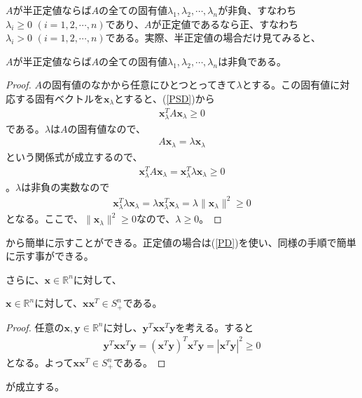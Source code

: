 $A$が半正定値ならば$A$の全ての固有値$\lambda_1, \lambda_2, \cdots, \lambda_n$が非負、すなわち$\lambda_i \geq 0 \,\, (i = 1, 2, \cdots, n)$であり、$A$が正定値であるなら正、すなわち$\lambda_i > 0 \,\, (i = 1, 2, \cdots, n)$である。実際、半正定値の場合だけ見てみると、
\begin{theorem*}
  $A$が半正定値ならば$A$の全ての固有値$\lambda_1, \lambda_2, \cdots, \lambda_n$は非負である。
\end{theorem*}
\begin{proof}
  $A$の固有値のなかから任意にひとつとってきて$\lambda$とする。この固有値に対応する固有ベクトルを$\mathbf{x}_\lambda$とすると、(\ref{PSD})から
  \begin{align*}
    \mathbf{x}_\lambda^T A \mathbf{x}_\lambda \geq 0
  \end{align*}
  である。$\lambda$は$A$の固有値なので、
  \begin{align*}
    A \mathbf{x}_\lambda = \lambda \mathbf{x}_\lambda
  \end{align*}
  という関係式が成立するので、
  \begin{align*}
    \mathbf{x}_\lambda^T A \mathbf{x}_\lambda = \mathbf{x}_\lambda^T \lambda \mathbf{x}_\lambda \geq 0
  \end{align*}
  。$\lambda$は非負の実数なので
  \begin{align*}
    \mathbf{x}_\lambda^T \lambda \mathbf{x}_\lambda = \lambda \mathbf{x}_\lambda^T \mathbf{x}_\lambda = \lambda \|\mathbf{x}_\lambda\|^2 \geq 0
  \end{align*}
  となる。ここで、$\|\mathbf{x}_\lambda\|^2 \geq 0$なので、$\lambda \geq 0$。
\end{proof}
から簡単に示すことができる。正定値の場合は(\ref{PD})を使い、同様の手順で簡単に示す事ができる。

さらに、$\mathbf{x} \in \mathbb{R}^n$に対して、
\begin{lemma*} %
  $\mathbf{x} \in \mathbb{R}^n$に対して、$\mathbf{x} \mathbf{x}^T \in S_+^n$である。
\end{lemma*}
\begin{proof}
  任意の$\mathbf{x}, \mathbf{y} \in \mathbb{R}^n$に対し、$\mathbf{y}^T \mathbf{x} \mathbf{x}^T \mathbf{y}$を考える。すると
  \begin{align*}
    \mathbf{y}^T \mathbf{x} \mathbf{x}^T \mathbf{y} = (\mathbf{x}^T \mathbf{y})^T \mathbf{x}^T \mathbf{y} = |\mathbf{x}^T \mathbf{y}|^2 \geq 0
  \end{align*}
  となる。よって$\mathbf{x} \mathbf{x}^T \in S_+^n$である。
\end{proof}
が成立する。

